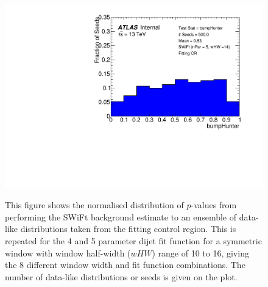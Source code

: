 \begin{figure}[!htb]
{}                                                                                              
 {                                                    
  \includegraphics[width=0.45\linewidth, angle=0]{figs/Dibjet/LowMass/FitStudy_min566/pVal_bumpHunter_corrFitCR_5para_low14_high14.pdf}
}                                                                                              

\caption{\label{fig:bumpH_spuriousSignal}
  This figure shows the normalised distribution of \bh{} \mbox{$p$-value}s from performing the SWiFt background estimate to an ensemble of
  data-like distributions taken from the \lm{} fitting control region.
  This is repeated for the 4 and 5 parameter dijet fit function for a symmetric window with window half-width ($wHW$) range of 10 to 16,
  giving the 8 different window width and fit function combinations.
  The number of data-like distributions or seeds is given on the plot.
}
\end{figure}

